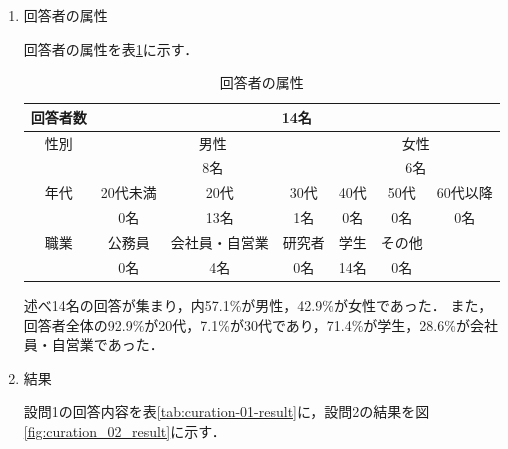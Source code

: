 \documentclass[a4paper]{jsarticle}
\begin{document}
\begin{enumerate}
\begin{enumerate}
\begin{enumerate}
  \item 回答者の属性

  回答者の属性を表\ref{tab:curation-userstatus}に示す．

  \begin{table}[H]
    \begin{center}
      \caption{回答者の属性}
      \renewcommand\arraystretch{1.4}
      \begin{tabular}{|c|c|c|c|c|c|c|}
        \hline
        \multicolumn{1}{|c|}{回答者数} & \multicolumn{6}{c|}{14名} \\
        \hline
        性別 & \multicolumn{3}{c|}{男性}　& \multicolumn{3}{c|}{女性} \\
        \cline{2-7}
        & \multicolumn{3}{c|}{8名}　& \multicolumn{3}{c|}{6名} \\
        \hline
        年代 & 20代未満 & 20代 & 30代 & 40代 & 50代 & 60代以降 \\
        \cline{2-7}
        & 0名 & 13名 & 1名 & 0名 & 0名 & 0名 \\
        \hline
        職業 & 公務員 & 会社員・自営業 & 研究者 & 学生 & その他 &  \\
        \cline{2-7}
        & 0名 & 4名 & 0名 & 14名 & 0名 & \\
        \hline
      \end{tabular}
      \label{tab:curation-userstatus}
    \end{center}
  \end{table}

  述べ14名の回答が集まり，内57.1\%が男性，42.9\%が女性であった．
  また，回答者全体の92.9\%が20代，7.1\%が30代であり，71.4\%が学生，28.6\%が会社員・自営業であった．

  \item 結果

  設問1の回答内容を表\ref{tab:curation-01-result}に，設問2の結果を図\ref{fig:curation_02_result}に示す．


\end{enumerate}
\end{enumerate}
\end{enumerate}
\end{document}
